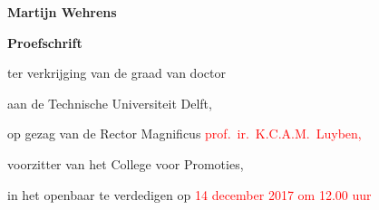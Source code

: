 \begin{titlepage}

\begin{center}

\vspace*{2\bigskipamount}

{\makeatletter
\titlestyle\bfseries\LARGE\@title
\makeatother}

{\makeatletter
\ifx\@subtitle\undefined\else
    \bigskip
    \titlefont\titleshape\Large\@subtitle
\fi
\makeatother}

\vspace{12cm} %

{\Large\titlefont\bfseries Martijn Wehrens}


\end{center}

\cleardoublepage
\thispagestyle{empty}

\begin{center}


\vspace*{2\bigskipamount}

{\makeatletter
\titlestyle\bfseries\LARGE\@title
\makeatother}

{\makeatletter
\ifx\@subtitle\undefined\else
    \bigskip
    \titlefont\titleshape\Large\@subtitle
\fi
\makeatother}

\vfill


{\Large\titlefont\bfseries Proefschrift}

\bigskip
\bigskip

ter verkrijging van de graad van doctor

aan de Technische Universiteit Delft,

op gezag van de Rector Magnificus \textcolor{red}{prof.~ir.~K.C.A.M.~Luyben,}

voorzitter van het College voor Promoties,

in het openbaar te verdedigen op \textcolor{red}{14 december 2017 om 12.00 uur}


\end{center}
\end{titlepage}
